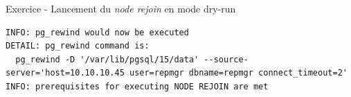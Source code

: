 \begin{frame}[fragile]{Exercice - Lancement du \textit{node rejoin} en mode dry-run}
\begin{itemize}
\begin{tiny}
\begin{Verbatim}[commandchars=\&\{\}]
INFO: pg_rewind would now be executed                                                                                                                                                         
DETAIL: pg_rewind command is:                                                                                                                                                                 
  pg_rewind -D '/var/lib/pgsql/15/data' --source-server='host=10.10.10.45 user=repmgr dbname=repmgr connect_timeout=2'                                                                        
INFO: prerequisites for executing NODE REJOIN are met
\end{Verbatim}
\end{tiny}
   \end{itemize}

\end{frame}



